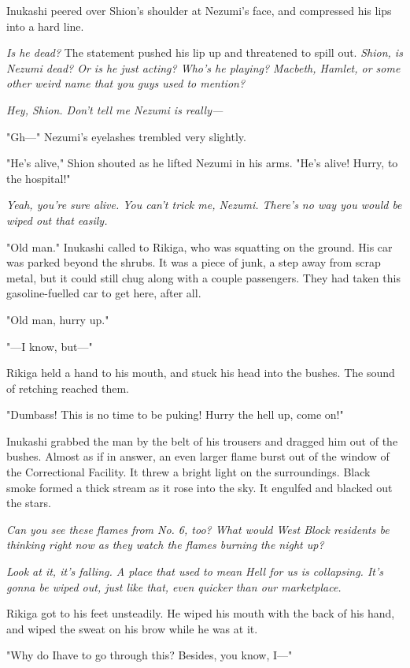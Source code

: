 Inukashi peered over Shion's shoulder at Nezumi's face, and compressed
his lips into a hard line.

\emph{Is he dead?} The statement pushed his lip up and threatened to spill out.
\emph{Shion, is Nezumi dead? Or is he just acting? Who's he playing? Macbeth,
Hamlet, or some other weird name that you guys used to mention?}

\emph{Hey, Shion. Don't tell me Nezumi is really---}

"Gh---" Nezumi's eyelashes trembled very slightly.

"He's alive," Shion shouted as he lifted Nezumi in his arms. "He's
alive! Hurry, to the hospital!"

\emph{Yeah, you're sure alive. You can't trick me, Nezumi. There's no way you
would be wiped out that easily.}

"Old man." Inukashi called to Rikiga, who was squatting on the ground.
His car was parked beyond the shrubs. It was a piece of junk, a step
away from scrap metal, but it could still chug along with a couple
passengers. They had taken this gasoline-fuelled car to get here, after
all.

"Old man, hurry up."

"---I know, but---"

Rikiga held a hand to his mouth, and stuck his head into the bushes. The
sound of retching reached them.

"Dumbass! This is no time to be puking! Hurry the hell up, come on!"

Inukashi grabbed the man by the belt of his trousers and dragged him out
of the bushes. Almost as if in answer, an even larger flame burst out of
the window of the Correctional Facility. It threw a bright light on the
surroundings. Black smoke formed a thick stream as it rose into the sky.
It engulfed and blacked out the stars.

\emph{Can you see these flames from No. 6, too? What would West Block
residents be thinking right now as they watch the flames burning the
night up?}

\emph{Look at it, it's falling. A place that used to mean Hell for us is
collapsing. It's gonna be wiped out, just like that, even quicker than
our marketplace.}

Rikiga got to his feet unsteadily. He wiped his mouth with the back of
his hand, and wiped the sweat on his brow while he was at it.

"Why do I\el have to go through this? Besides, you know, I---"

